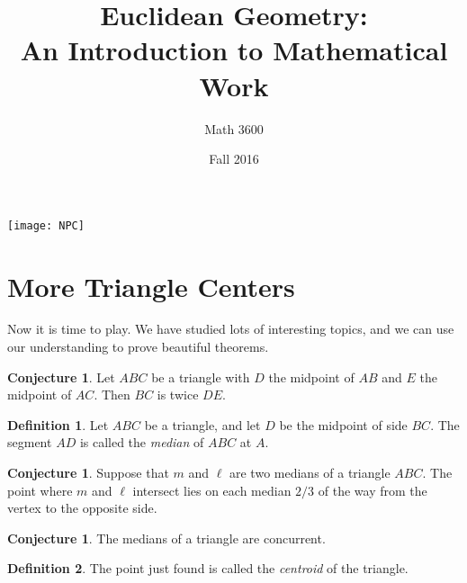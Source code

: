 \documentclass{tufte-handout}
\title{Euclidean Geometry:\\An Introduction to Mathematical Work}
\author[]{Math 3600}
\date{Fall 2016}
\theoremstyle{definition}
\newtheorem{conjecture}[problem]{Conjecture}
\newtheorem*{definition}{Definition}
\newtheorem{challenge}[problem]{Challenge}
\begin{document}
\maketitle

\begin{marginfigure}
    \texttt{[image: NPC]}
\end{marginfigure}

\setcounter{section}{17}
\section{More Triangle Centers}

Now it is time to play. We have studied lots of interesting topics, and we can use our understanding to prove beautiful theorems.

\begin{conjecture} Let $ABC$ be a triangle with $D$ the midpoint of $AB$ and $E$ the midpoint of $AC$. Then $BC$ is twice $DE$.
\end{conjecture}

\begin{definition}\label{defn:median}
Let $ABC$ be a triangle, and let $D$ be the midpoint of side $BC$. The segment $AD$ is called the \emph{median} of $ABC$ at $A$.
\end{definition}

\begin{conjecture}\label{conj:location-median}
Suppose that $m$ and $\ell $ are two medians of a triangle $ABC$.  The point where $m$ and $\ell$ intersect lies on each median $2/3$ of the way from the vertex to the opposite side.
\end{conjecture}

\begin{conjecture}\label{conj:medians-concurrent}
The medians of a triangle are concurrent.
\end{conjecture}

\begin{definition}\label{defn:centroid}
The point just found is called the \emph{centroid} of the triangle.
\end{definition}

%
\end{document}
